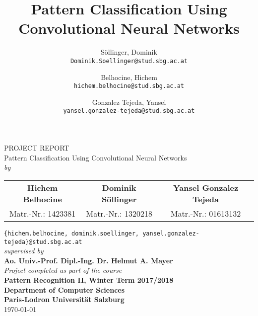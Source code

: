 \documentclass[a4paper, 11pt, twoside, openright]{article}
\author{
	Söllinger, Dominik\\
	\texttt{Dominik.Soellinger@stud.sbg.ac.at}
	\and
	Belhocine, Hichem\\
	\texttt{hichem.belhocine@stud.sbg.ac.at}
	\and
	Gonzalez Tejeda, Yansel\\
	\texttt{yansel.gonzalez-tejeda@stud.sbg.ac.at}
}
\title{Pattern Classification Using Convolutional Neural Networks}
\begin{document}
	\begin{titlepage}
		\centering
		\vfill
		\LARGE{PROJECT REPORT}\\
		\vspace{1cm}
		\LARGE{Pattern Classification Using Convolutional Neural Networks}\\
		\vspace{1cm}
		\normalsize{\textit{by}}\\
		\vspace{1cm}
		\begin{table}[h]
			\centering
			\begin{tabular}{c c c}
				\textbf{Hichem Belhocine} & \textbf{Dominik Söllinger} & \textbf{Yansel Gonzalez Tejeda} \\
				Matr.-Nr.: 1423381 & Matr.-Nr.: 1320218 & Matr.-Nr.: 01613132\\
			\end{tabular}
		\end{table}
		\normalsize{\texttt{\{hichem.belhocine, dominik.soellinger, yansel.gonzalez-tejeda\}@stud.sbg.ac.at}}\\
		\vspace{1cm}
		\normalsize{\textit{supervised by}}\\
		\vspace{1cm}
		\normalsize{\textbf{Ao. Univ.-Prof. Dipl.-Ing. Dr. Helmut A. Mayer}}\\
		\vspace{1cm}
		\normalsize{\textit{Project completed as part of the course}}\\
		\vspace{1cm}
		\normalsize{\textbf{Pattern Recognition II, Winter Term 2017/2018}}\\
		\vspace{1cm}
		\normalsize{\textbf{Department of Computer Sciences}}\\
		\vspace{1cm}
		\normalsize{\textbf{Paris-Lodron Universität Salzburg}}\\
		\vfill
		\today
	\end{titlepage}
	\clearpage %
	\begingroup
	\pagestyle{empty}
	\null
	\endgroup
\end{document}

